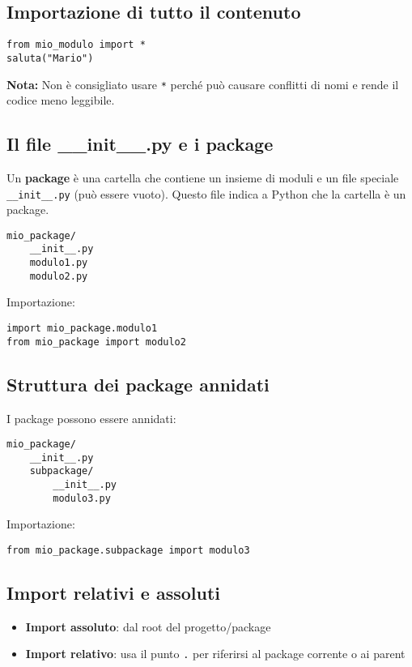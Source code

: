 \documentclass[a4paper,12pt]{article}
\begin{document}
\subsection*{Importazione di tutto il contenuto}
\begin{lstlisting}
from mio_modulo import *
saluta("Mario")
\end{lstlisting}
\textbf{Nota:} Non è consigliato usare \texttt{*} perché può causare conflitti di nomi e rende il codice meno leggibile.

\subsection*{Il file \_\_init\_\_.py e i package}
Un \textbf{package} è una cartella che contiene un insieme di moduli e un file speciale \texttt{\_\_init\_\_.py} (può essere vuoto). Questo file indica a Python che la cartella è un package.

\begin{verbatim}
mio_package/
    __init__.py
    modulo1.py
    modulo2.py
\end{verbatim}

Importazione:

\begin{lstlisting}
import mio_package.modulo1
from mio_package import modulo2
\end{lstlisting}

\subsection*{Struttura dei package annidati}
I package possono essere annidati:

\begin{verbatim}
mio_package/
    __init__.py
    subpackage/
        __init__.py
        modulo3.py
\end{verbatim}

Importazione:

\begin{lstlisting}
from mio_package.subpackage import modulo3
\end{lstlisting}

\subsection*{Import relativi e assoluti}
\begin{itemize}
    \item \textbf{Import assoluto}: dal root del progetto/package
    \item \textbf{Import relativo}: usa il punto \texttt{.} per riferirsi al package corrente o ai parent
\end{itemize}
\end{document}
